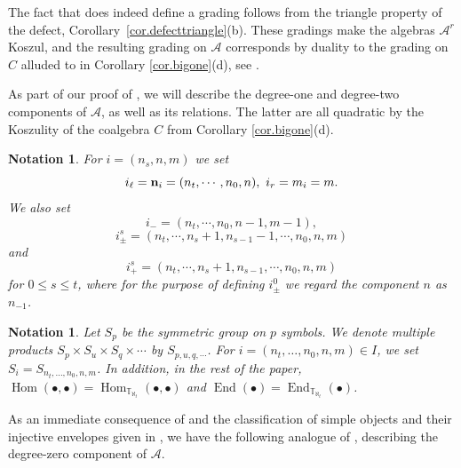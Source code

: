 \documentclass[11pt]{article}
\theoremstyle{plain}
\theoremstyle{nonumberplain}
\theoremstyle{plain}
\newtheorem{notation}[lemma]{Notation}
\theoremstyle{nonumberplain}
\newcommand\bT{\mathbb T}
\newcommand\cA{\mathcal A}
\DeclareMathOperator{\End}{\mathrm{End}}
\DeclareMathOperator{\Hom}{\mathrm{Hom}}
\begin{document}
  The fact that  does indeed define a grading
  follows from the triangle property of the defect, Corollary~\ref{cor.defecttriangle}(b).
  These gradings make the algebras $\cA^r$ Koszul, and the resulting
  grading on $\cA$ corresponds by duality to the grading on $C$ alluded to in
  Corollary \ref{cor.bigone}(d), see .



As part of our proof of , we will describe the
degree-one and degree-two components of $\cA$, as well as its
relations.  The latter are all quadratic by the Koszulity of the coalgebra $C$ from Corollary \ref{cor.bigone}(d).
 
\begin{notation}\label{not.indx}
  For $i=(n_s,n,m)$ we set 
  \begin{equation*}
    i_\ell = {\bf n}_i = (n_t,\cdots,n_0,n),\ i_r = m_i = m.
  \end{equation*}
We also set 
\begin{equation*}
  i_- = (n_t,\cdots,n_0,n-1,m-1),
\end{equation*}
\begin{equation*}
  i^s_{\pm}  = (n_t,\cdots, n_{s}+1,n_{s-1}-1,\cdots, n_0,n,m)
\end{equation*}
and 
\begin{equation*}
  i^s_+  = (n_t,\cdots, n_{s}+1,n_{s-1},\cdots, n_{0},n,m)
\end{equation*}
for $0\le s\le t$, where for the purpose of defining $i^0_{\pm}$ we
regard the component $n$ as $n_{-1}$.
\end{notation}


\begin{notation}\label{not.sym}
Let $S_p$ be the symmetric group on $p$ symbols. We denote multiple products $S_p\times S_u\times S_q\times\cdots$ by
$S_{p,u,q,\cdots}$.  For $i=\left(n_t,\ldots,n_0,n,m\right)\in I$, we set $S_{i}=S_{n_t,\ldots,n_0,n,m}$.  In addition, in the rest of the paper, $\Hom(\bullet,\bullet)=\Hom_{\bT_{\aleph_t}}(\bullet,\bullet)$ and $\End(\bullet)=\End_{\bT_{\aleph_t}}(\bullet)$.
\end{notation}


As an immediate consequence of  and the
classification of simple objects and their injective envelopes given
in , we have the following analogue of
\cite[Lemma 3.22]{us}, describing the degree-zero component
of $\cA$.
\end{document}

